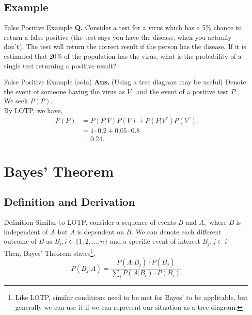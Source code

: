 \documentclass{beamer}
\begin{document}
\subsection{Example}

\begin{frame}{False Positive Example}
    \textbf{Q.} Consider a test for a virus which has a 5\% chance to return a false positive (the test says you have the disease, when you actually don't). The test will return the correct result if the person has the disease. If it is estimated that 20\% of the population has the virus, what is the probability of a single test returning a positive result?
\end{frame}

\begin{frame}{False Positive Example (soln)}
    \textbf{Ans.} (Using a tree diagram may be useful) Denote the event of someone having the virus as $V,$ and the event of a positive test $P.$ We seek $P(P).$ \\
    By LOTP, we have,
    \begin{align*}
        P(P) &= P(P | V) P(V) + P(P | V^c) P(V^c) \\
        &= 1 \cdot 0.2 + 0.05 \cdot 0.8 \\
        & = 0.24.
    \end{align*}
\end{frame}

\section{Bayes' Theorem}
\subsection{Definition and Derivation}

\begin{frame}{Definition}
    Similar to LOTP, consider a sequence of events $B$ and $A,$ where $B$ is independent of $A$ but $A$ is dependent on $B.$ We can denote each different outcome of $B$ as $B_i, i \in \{1,2,\dots,n \}$ and a specific event of interest $B_j, j \subset i.$ 
    \newline \newline
    Then, Bayes' Theorem states\footnote{Like LOTP, similar conditions need to be met for Bayes' to be applicable, but generally we can use it if we can represent our situation as a tree diagram.},
    $$
    P(B_j|A) = \frac{P(A | B_j) \cdot P(B_j)}{\sum_{i} P(A | B_i) \cdot P(B_i)}
    $$
\end{frame}
\end{document}
